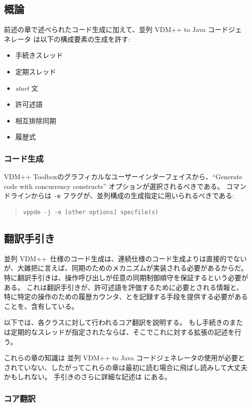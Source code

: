 \documentclass[\pformat,11pt]{jarticle}
\newcommand{\ToolboxName}{VDM++ Toolbox}
\newcommand{\VDM}{VDM++}
\newcommand{\cg}{VDM++ to Java コードジェネレータ}
\newcommand{\ccg}{並列 \cg}
\begin{document}
\subsection{概論}
前述の章で述べられたコード生成に加えて、\ccg{} は以下の構成要素の生成を許す:
\begin{itemize}
\item 手続きスレッド
\item 定期スレッド
\item  \textit{start} 文
\item 許可述語
\item 相互排除同期
\item 履歴式
\end{itemize}

\subsubsection{コード生成}
 \ToolboxName のグラフィカルなユーザーインターフェイスから、``Generate code with concurrency constructs'' オプションが選択されるべきである。
コマンドラインからは \texttt{-e} フラグが、並列構成の生成指定に用いられるべきである:
\begin{quote}
\begin{verbatim}
vppde -j -e [other options] specfile(s)
\end{verbatim}
\end{quote}

\subsection{翻訳手引き}
並列 \VDM\ 仕様のコード生成は、連続仕様のコード生成よりは直接的でないが、大雑把に言えば、同期のためのメカニズムが実装される必要があるからだ。
特に翻訳手引きは、操作呼び出しが任意の同期制御順守を保証するという必要がある。
これは翻訳手引きが、許可述語を評価するために必要とされる情報と、特に特定の操作のための履歴カウンタ、とを記録する手段を提供する必要があることを、含有している。

以下では、各クラスに対して行われるコア翻訳を説明する。
もし手続きのまたは定期的なスレッドが指定されたならば、そこでこれに対する拡張の記述を行う。

これらの章の知識は \ccg の使用が必要とされていない、したがってこれらの章は最初に読む場合に飛ばし読みして大丈夫かもしれない。
手引きのさらに詳細な記述は \cite{Oppitz99-CSK}にある。

\subsubsection{コア翻訳}
\end{document}
